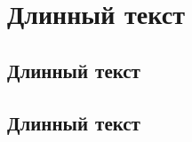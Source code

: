 \begin{flushright}
\end{flushright}


\section[Текст]{Длинный текст}


\subsection[Текст]{Длинный текст}




\subsection[Текст]{Длинный текст}

\pagebreak
